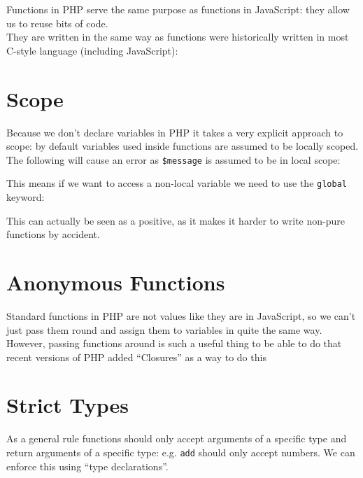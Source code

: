 Functions in PHP serve the same purpose as functions in JavaScript: they allow us to reuse bits of code.
\\

They are written in the same way as functions were historically written in most C-style language (including JavaScript):



\section{Scope}

Because we don't declare variables in PHP it takes a very explicit approach to scope: by default variables used inside functions are assumed to be locally scoped.
\\

The following will cause an error as \texttt{\$message} is assumed to be in local scope:


This means if we want to access a non-local variable we need to use the \texttt{global} keyword:


This can actually be seen as a positive, as it makes it harder to write non-pure functions by accident.


\section{Anonymous Functions}

Standard functions in PHP are not values like they are in JavaScript, so we can't just pass them round and assign them to variables in quite the same way. However, passing functions around is such a useful thing to be able to do that recent versions of PHP added ``Closures'' as a way to do this



\section{Strict Types}

As a general rule functions should only accept arguments of a specific type and return arguments of a specific type: e.g. \texttt{add} should only accept numbers. We can enforce this using ``type declarations''.
\\

